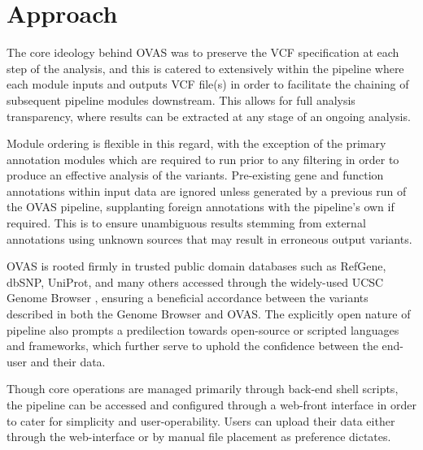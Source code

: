 \documentclass{bioinfo}
\def\app{OVAS}
\begin{document}
\section{Approach}

The core ideology behind \app{} was to preserve the VCF specification at each step of the analysis, and this is catered to extensively within the pipeline where each module inputs and outputs VCF file(s) in order to facilitate the chaining of subsequent pipeline modules downstream. This allows for full analysis transparency, where results can be extracted at any stage of an ongoing analysis. 

Module ordering is flexible in this regard, with the exception of the primary annotation modules which are required to run prior to any filtering in order to produce an effective analysis of the variants. Pre-existing gene and function annotations within input data are ignored unless generated by a previous run of the \app{} pipeline, supplanting foreign annotations with the pipeline's own if required. This is to ensure unambiguous results stemming from external annotations using unknown sources that may result in erroneous output variants.

\app{} is rooted firmly in trusted public domain databases such as RefGene, dbSNP, UniProt, and many others accessed through the widely-used UCSC Genome Browser \citep{karolchik2003ucsc}, ensuring a beneficial accordance between the variants described in both the Genome Browser and \app{}. The explicitly open nature of pipeline also prompts a predilection towards open-source or scripted languages and frameworks, which further serve to uphold the confidence between the end-user and their data.

Though core operations are managed primarily through back-end shell scripts, the pipeline can be accessed and configured through a web-front interface in order to cater for simplicity and user-operability. Users can upload their data either through the web-interface or by manual file placement as preference dictates.
\end{document}
